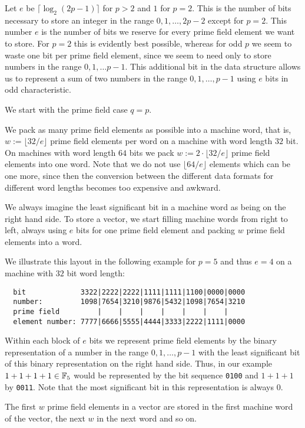 Let $e$ be $\lceil \log_2(2p-1)\rceil$ for $p > 2$ and $1$ for $p=2$. 
This is the number of bits
necessary to store an integer in the range $0,1, \ldots, 2p-2$ except
for $p=2$. This number $e$ is the number of bits we 
reserve for every prime field element we want to store. For $p=2$ this
is evidently best possible, whereas for odd $p$ we seem to waste
one bit per prime field element, since we seem to need only to store
numbers in the range $0,1,\ldots p-1$. This additional bit in the
data structure allows us to represent a sum of two numbers in the
range $0,1,\ldots, p-1$ using $e$ bits in odd characteristic.

We start with the prime field case $q=p$.

We pack as many prime field elements as possible into a machine
word, that is, $w := \lfloor 32/e \rfloor$ prime field elements per word
on a machine with word length $32$ bit. On machines with word length $64$ bits
we pack $w := 2 \cdot \lfloor 32/e \rfloor$ prime field elements into one word.
Note that we do not use $\lfloor 64/e \rfloor$ elements which can be one
more, since then the conversion between the different data formats for
different word lengths becomes too expensive and awkward.

We always imagine the least significant bit in a machine word as being 
on the right hand side. To store a vector, we start filling machine words 
from right to left, always using $e$ bits for one prime field element and
packing $w$ prime field elements into a word.

We illustrate this layout in the following example for $p=5$ and thus
$e=4$ on a machine with $32$ bit word length:

\begin{verbatim}
  bit             3322|2222|2222|1111|1111|1100|0000|0000
  number:         1098|7654|3210|9876|5432|1098|7654|3210
  prime field         |    |    |    |    |    |    |
  element number: 7777|6666|5555|4444|3333|2222|1111|0000
\end{verbatim}

Within each block of $e$ bits we represent prime field elements
by the binary representation of a number in the range $0,1,\ldots,p-1$
with the least significant bit of this binary representation on the
right hand side. Thus, in our example $1+1+1+1 \in \mathbb{F}_5$ would be
represented by the bit sequence \texttt{0100} and $1+1+1$ by \texttt{0011}.
Note that the most significant bit in this representation is always $0$.

The first $w$ prime field elements in a vector are stored in the first
machine word of the vector, the next $w$ in the next word and so on.

